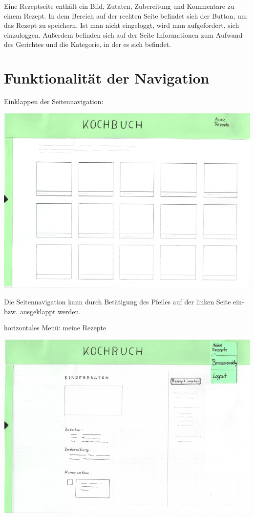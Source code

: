 \documentclass[parskip,10pt,abstracton]{scrartcl}
\begin{document}
Eine Rezeptseite enthält ein Bild, Zutaten, Zubereitung und Kommentare zu einem Rezept. In dem Bereich auf der rechten Seite befindet sich der Button, um das Rezept zu speichern. Ist man nicht eingeloggt, wird man aufgefordert, sich einzuloggen. 
Außerdem befinden sich auf der Seite Informationen zum Aufwand des Gerichtes und die Kategorie, in der es sich befindet. 
\newpage
\section*{Funktionalität der Navigation}

Einklappen der Seitennavigation:
\begin{center}
\includegraphics[scale=0.4]{Prototyp/home_menuhidden.png}
\end{center}

Die Seitennavigation kann durch Betätigung des Pfeiles auf der linken Seite ein- bzw. ausgeklappt werden. 

horizontales Menü: meine Rezepte
\begin{center}
\includegraphics[scale=0.4]{Prototyp/menu_eigeneRezepte_menuhidden.png}
\end{center}
\end{document}
